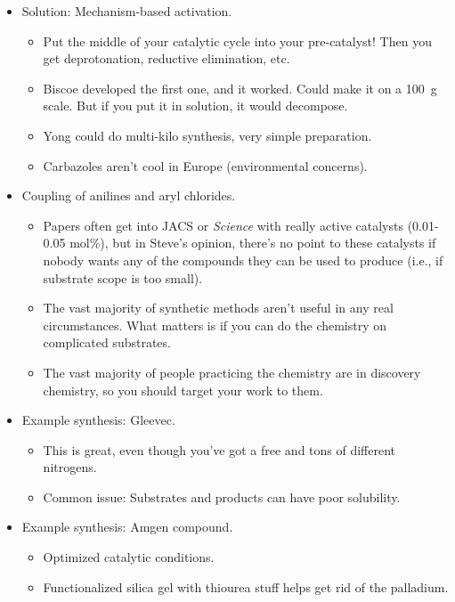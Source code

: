 \documentclass[../notes.tex]{subfiles}
\begin{document}
\begin{itemize}
\begin{itemize}
    \end{itemize}
    \item Solution: Mechanism-based activation.
    \begin{itemize}
        \item Put the middle of your catalytic cycle into your pre-catalyst! Then you get deprotonation, reductive elimination, etc.
        \item Biscoe developed the first one, and it worked. Could make it on a \SI{100}{\gram} scale. But if you put it in solution, it would decompose.
        \item Yong could do multi-kilo synthesis, very simple preparation.
        \item Carbazoles aren't cool in Europe (environmental concerns).
    \end{itemize}
    \item Coupling of anilines and aryl chlorides.
    \begin{itemize}
        \item Papers often get into JACS or \emph{Science} with really active catalysts (0.01-0.05 mol\%), but in Steve's opinion, there's no point to these catalysts if nobody wants any of the compounds they can be used to produce (i.e., if substrate scope is too small).
        \item The vast majority of synthetic methods aren't useful in any real circumstances. What matters is if you can do the chemistry on complicated substrates.
        \item The vast majority of people practicing the chemistry are in discovery chemistry, so you should target your work to them.
    \end{itemize}
    \item Example synthesis: Gleevec.
    \begin{itemize}
        \item This is great, even though you've got a free  and tons of different nitrogens.
        \item Common issue: Substrates and products can have poor solubility.
    \end{itemize}
    \item Example synthesis: Amgen compound.
    \begin{itemize}
        \item Optimized catalytic conditions.
        \item Functionalized silica gel with thiourea stuff helps get rid of the palladium.
    \end{itemize}

\end{itemize}
\end{document}
